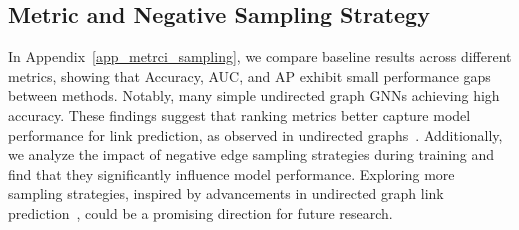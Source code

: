 \subsection{Metric and Negative Sampling Strategy}
In Appendix~\ref{app_metrci_sampling}, we compare baseline results across different metrics, showing that Accuracy, AUC, and AP exhibit small performance gaps between methods. Notably, many simple undirected graph GNNs achieving high accuracy. These findings suggest that ranking metrics better capture model performance for link prediction, as observed in undirected graphs~\cite{yang2015evaluating}. Additionally, we analyze the impact of negative edge sampling strategies during training and find that they significantly influence model performance. Exploring more sampling strategies, inspired by advancements in undirected graph link prediction~\cite{li2023evaluating}, could be a promising direction for future research.















